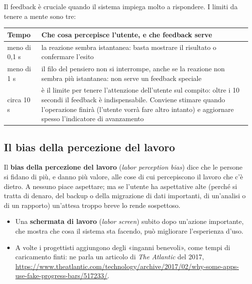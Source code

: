 Il feedback è cruciale quando il sistema impiega molto a rispondere. I limiti da tenere a mente sono tre:

\begin{center}
\renewcommand{\arraystretch}{1.3}
\begin{tabular}{@{}P{2.6cm}P{11.4cm}@{}}
  \toprule
  \textbf{Tempo} & \textbf{Che cosa percepisce l'utente, e che feedback serve} \\ \midrule
  meno di 0,1 s & la reazione sembra istantanea: basta mostrare il risultato o confermare l'esito \\
  meno di 1 s & il filo del pensiero non si interrompe, anche se la reazione non sembra più istantanea: non serve un
    feedback speciale \\
  circa 10 s & è il limite per tenere l'attenzione dell'utente sul compito: oltre i 10 secondi il feedback è
    indispensabile. Conviene stimare quando l'operazione finirà (l'utente vorrà fare altro intanto) e aggiornare spesso
    l'indicatore di avanzamento \\
  \bottomrule
\end{tabular}
\end{center}

\subsection{Il bias della percezione del lavoro}

Il \textbf{bias della percezione del lavoro} (\textit{labor perception bias}) dice che le persone si fidano di più, e
danno più valore, alle cose di cui percepiscono il lavoro che c'è dietro. A nessuno piace aspettare; ma se l'utente ha
aspettative alte (perché si tratta di denaro, del backup o della migrazione di dati importanti, di un'analisi o di un
rapporto) un'attesa troppo breve lo rende sospettoso.

\begin{itemize}
  \item Una \textbf{schermata di lavoro} (\textit{labor screen}) subito dopo un'azione importante, che mostra che cosa
        il sistema sta facendo, può migliorare l'esperienza d'uso.
  \item A volte i progettisti aggiungono degli «inganni benevoli», come tempi di caricamento finti: ne parla un articolo
        di \textit{The Atlantic} del 2017,
        \url{https://www.theatlantic.com/technology/archive/2017/02/why-some-apps-use-fake-progress-bars/517233/}.
\end{itemize}

